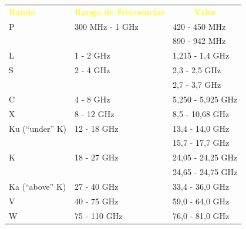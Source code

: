 \begin{landscape}
\begin{minipage}[c]{0.50\textheight}
  \end{minipage}
  \begin{minipage}[c]{0.50\textheight}

  \centering

  \label{tab:06.bandas.radar}

  \begin{adjustbox}{width = 0.9\linewidth}

    \begin{tabular}{lll} \rowcolor{blue!50!black} \centering
      \textcolor{yellow}{\bf Banda} & \textcolor{yellow}{ {\bf Rango
          de Frecuencias}}
      & \multicolumn{1}{c}{ \textcolor{yellow}{\bf Valor}} \\
      P & 300 MHz - 1 GHz & 420 - 450 MHz \\
      & & 890 - 942 MHz \\ \hline L & 1 - 2 GHz & 1,215 - 1,4 GHz \\
      \hline
      S  & 2 - 4 GHz & 2,3  - 2,5 GHz \\
      & & 2,7 - 3,7 GHz \\ \hline C & 4 - 8 GHz & 5,250 - 5,925 GHz \\
      \hline X & 8 - 12 GHz & 8,5 - 10,68 GHz \\ \hline
      Ku (``under'' K) & 12 - 18 GHz & 13,4 - 14,0 GHz \\
      & & 15,7 - 17,7 GHz \\ \hline
      K & 18 - 27 GHz & 24,05 - 24,25 GHz \\
      & & 24,65 - 24,75 GHz \\ \hline Ka (``above'' K) & 27 - 40 GHz &
      33,4 - 36,0 GHz \\ \hline V & 40 - 75 GHz & 59,0 - 64,0 GHz \\
      \hline W & 75 - 110 GHz & 76,0 - 81,0 GHz \\ \hline 
    \end{tabular}

  \end{adjustbox}

  \end{minipage}



\end{landscape}


